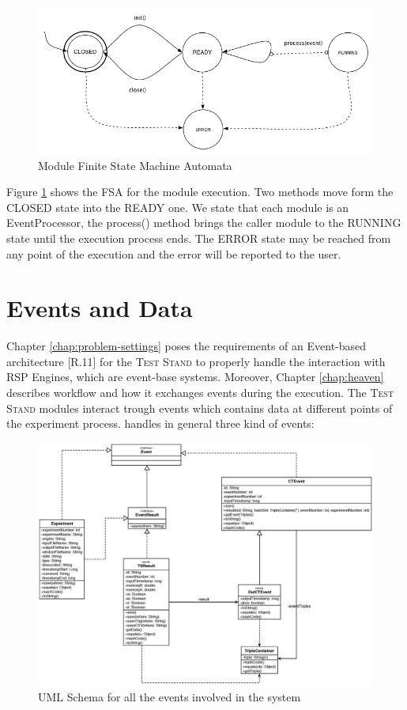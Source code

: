 \begin{figure}[tbh]
  \centering
	\includegraphics[width=\linewidth]{images/fsm-schema}
	\caption{Module Finite State Machine Automata} 
  	\label{fig:module-fsm}
\end{figure}

Figure \ref{fig:module-fsm} shows the FSA for the module execution. Two methods move form the CLOSED state into the READY one. We state that each module is an EventProcessor, the process() method brings the caller module to the RUNNING state until the execution process ends. The ERROR state may be reached from any point of the execution and the error will be reported to the user.

\section{Events and Data}\label{sec:data-impl}

Chapter \ref{chap:problem-settings} poses the requirements of an Event-based architecture [R.11] for the \textsc{Test Stand} to properly handle the interaction with RSP Engines, which are event-base systems. Moreover, Chapter \ref{chap:heaven} describes \name workflow and how it exchanges events during the execution. The \textsc{Test Stand} modules interact trough events which contains data at different points of the experiment process. \name handles in general three kind of events:

\begin{figure}[tbh]
  \centering
	\includegraphics[width=\linewidth]{images/uml_events}
	\caption{UML Schema for all the events involved in the system} 
  	\label{fig:uml_events}
\end{figure}

